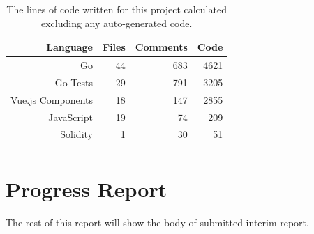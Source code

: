 \begin{longtable}{ r r r r }
  \toprule
  \textbf{Language} & \textbf{Files} & \textbf{Comments} & \textbf{Code}
  \\\midrule\midrule
  Go
  & 44
  & 683
  & 4621
  \\
  Go Tests
  & 29
  & 791
  & 3205
  \\
  Vue.js Components
  & 18
  & 147
  & 2855
  \\
  JavaScript
  & 19
  & 74
  & 209
  \\
  Solidity
  & 1
  & 30
  & 51
  \\\bottomrule\bottomrule
  \caption{The lines of code written for this project calculated excluding any auto-generated code.}
  \label{tab:cloc}
\end{longtable}


\chapter{Progress Report}\label{app:interim}

The rest of this report will show the body of submitted interim report.

